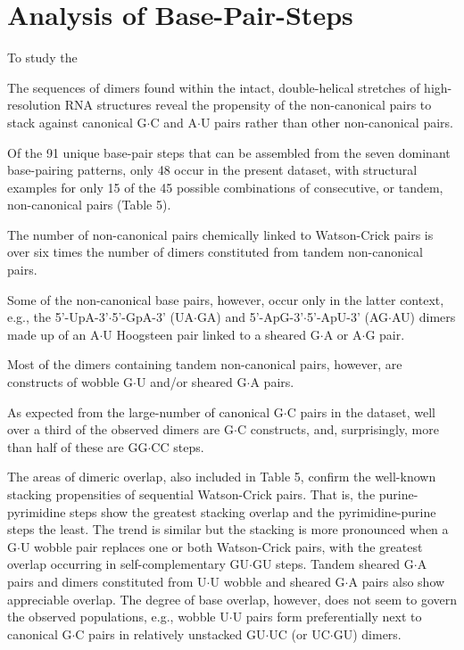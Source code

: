 \section{Analysis of Base-Pair-Steps}
To study the 


The  sequences  of  dimers  found within  the  intact,  double-helical
stretches of  high-resolution RNA structures reveal  the propensity of
the  non-canonical  pairs to  stack  against  canonical G$\cdot$C  and
A$\cdot$U  pairs rather  than  other non-canonical  pairs.

Of the  91
unique base-pair steps  that can be assembled from  the seven dominant
base-pairing  patterns, only  48 occur  in the  present  dataset, with
structural examples  for only  15 of the  45 possible  combinations of
consecutive, or tandem, non-canonical pairs (Table 5).

The number of
non-canonical pairs  chemically linked  to Watson-Crick pairs  is over
six times  the number of dimers constituted  from tandem non-canonical
pairs.

Some of the non-canonical  base pairs, however, occur only in
the   latter  context,   e.g.,  the   5'-UpA-3'$\cdot$5'-GpA-3'
(UA$\cdot$GA)  and 5'-ApG-3'$\cdot$5'-ApU-3'  (AG$\cdot$AU) dimers
made up of  an A$\cdot$U Hoogsteen pair linked  to a sheared G$\cdot$A
or A$\cdot$G pair.

Most  of the dimers containing tandem non-canonical
pairs,  however, are  constructs  of wobble  G$\cdot$U and/or  sheared
G$\cdot$A  pairs.

As  expected  from the  large-number  of  canonical
G$\cdot$C  pairs in the  dataset, well  over a  third of  the observed
dimers are  G$\cdot$C constructs, and, surprisingly,  more than half
of these are GG$\cdot$CC steps.

The areas  of dimeric overlap, also  included in Table  5, confirm the
well-known   stacking    propensities   of   sequential   Watson-Crick
pairs. That is, the purine-pyrimidine steps show the greatest stacking
overlap  and  the pyrimidine-purine  steps  the  least.  The trend  is
similar but  the stacking is  more pronounced when a  G$\cdot$U wobble
pair  replaces  one or  both  Watson-Crick  pairs,  with the  greatest
overlap  occurring  in  self-complementary GU$\cdot$GU  steps.  Tandem
sheared G$\cdot$A pairs and dimers constituted from U$\cdot$U wobble
and sheared G$\cdot$A pairs also show appreciable overlap.  The degree
of  base  overlap, however,  does  not  seem  to govern  the  observed
populations, e.g., wobble U$\cdot$U pairs form preferentially next to
canonical  G$\cdot$C  pairs in  relatively  unstacked GU$\cdot$UC  (or
UC$\cdot$GU) dimers.

